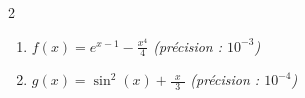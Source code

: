 \begin{boxexstheorieligne}
\begin{enumerate}[label=\textbf{E\thechapter.\arabic*},itemsep=4mm,resume=refexercices]
\begin{multicols}{2}
\begin{enumerate}[label=\roman*)]
\item $f(x)=e^{x-1}-\frac{x^4}{4}$ \textit{(précision : $10^{-3}$)}
\item $g(x)=\sin^2(x)+\frac{\phantom{^4}x\phantom{^4}}{3}$ \textit{(précision : $10^{-4}$)}
\end{enumerate}
\end{multicols}
%
\end{enumerate}
\end{boxexstheorieligne}



























































